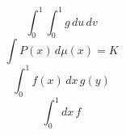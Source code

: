 \documentclass{article}
\begin{document}
\[ \int_{0}^{1}\int_{0}^{1}g\,du\,dv \]
\[ \int P(x)\,d\mu(x)=K \]
\[ \int_{0}^{1}f(x)\,dx\,g(y) \]
\[ \int_0^1 dx\,f \]
\end{document}
